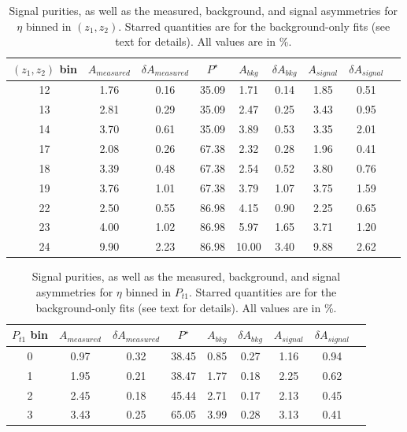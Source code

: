 \begin{table}[H]\footnotesize
\centering
\begin{tabular}{|c|c|c|c|c|c|c|c|c|}
 \hline
$(z_1,z_2)$ bin & $A_{measured}$ & $\delta A_{measured}$ & $P^{\star}$ & $A_{bkg}$ & $\delta A_{bkg}$ & $A_{signal}$ & $\delta A_{signal}$ \\ \hline \hline
12 & 1.76 & 0.16 & 35.09 & 1.71 & 0.14 & 1.85  & 0.51 \\ \hline 
13 & 2.81 & 0.29 & 35.09 & 2.47 & 0.25 & 3.43  & 0.95 \\ \hline 
14 & 3.70 & 0.61 & 35.09 & 3.89 & 0.53 & 3.35  & 2.01 \\ \hline \hline
17 & 2.08 & 0.26 & 67.38 & 2.32 & 0.28 & 1.96  & 0.41 \\ \hline 
18 & 3.39 & 0.48 & 67.38 & 2.54 & 0.52 & 3.80  & 0.76 \\ \hline 
19 & 3.76 & 1.01 & 67.38 & 3.79 & 1.07 & 3.75  & 1.59 \\ \hline \hline
22 & 2.50 & 0.55 & 86.98 & 4.15 & 0.90 & 2.25  & 0.65 \\ \hline 
23 & 4.00 & 1.02 & 86.98 & 5.97 & 1.65 & 3.71  & 1.20 \\ \hline 
24 & 9.90 & 2.23 & 86.98 & 10.00 & 3.40 & 9.88  & 2.62 \\ \hline
\end{tabular}
\caption[BG-correction quantities for $\eta$ asymmetries, $(z_1,z_2)$ bins]{Signal purities, as well as the measured, background, and signal asymmetries for $\eta$ binned in $(z_1,z_2)$. Starred quantities are for the background-only fits (see text for details). All values are in \%.}
\label{tab:etacomzbkgcor}
\end{table} 

\begin{table}[H]\footnotesize
\centering
\begin{tabular}{|c|c|c|c|c|c|c|c|c|}
\hline
$P_{t1}$ bin & $A_{measured}$ & $\delta A_{measured}$ & $P^{\star}$  & $A_{bkg}$ & $\delta A_{bkg}$ & $A_{signal}$ & $\delta A_{signal}$ \\ \hline \hline
0 & 0.97 & 0.32 & 38.45 & 0.85 & 0.27 & 1.16  & 0.94 \\ \hline 
1 & 1.95 & 0.21 & 38.47 & 1.77 & 0.18 & 2.25  & 0.62 \\ \hline 
2 & 2.45 & 0.18 & 45.44 & 2.71 & 0.17 & 2.13  & 0.45 \\ \hline 
3 & 3.43 & 0.25 & 65.05 & 3.99 & 0.28 & 3.13  & 0.41 \\ \hline 
\end{tabular}
\caption[BG-correction quantities for $\eta$ asymmetries, $P_{t1}$ bins]{Signal purities, as well as the measured, background, and signal asymmetries for $\eta$ binned in $P_{t1}$. Starred quantities are for the background-only fits (see text for details). All values are in \%.}
\label{tab:etasinptbkgcor}
\end{table}

